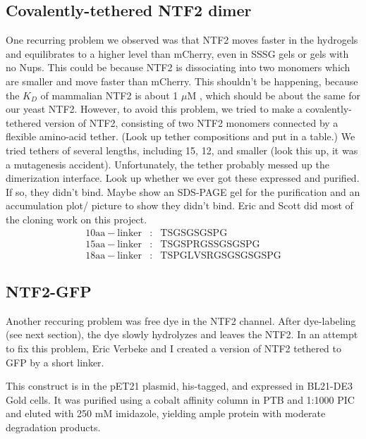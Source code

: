 \subsection{Covalently-tethered NTF2 dimer}
One recurring problem we observed was that NTF2 moves faster in the hydrogels and equilibrates to a higher level than mCherry, even in SSSG gels or gels with no Nups.  This could be because NTF2 is dissociating into two monomers which are smaller and move faster than mCherry.  This shouldn't be happening, because the $K_D$ of mammalian NTF2 is about 1 $\mu$M \cite{chaillan-huntington01}, which should be about the same for our yeast NTF2.  However, to avoid this problem, we tried to make a covalently-tethered version of NTF2, consisting of two NTF2 monomers connected by a flexible amino-acid tether.  (Look up tether compositions and put in a table.)  We tried tethers of several lengths, including 15, 12, and smaller (look this up, it was a mutagenesis accident).  Unfortunately, the tether probably messed up the dimerization interface.  Look up whether we ever got these expressed and purified.  If so, they didn't bind.  Maybe show an SDS-PAGE gel for the purification and an accumulation plot/ picture to show they didn't bind. Eric and Scott did most of the cloning work on this project.
\begin{align*}
\mathrm{10aa-linker}&:&\mathrm{TSGSGSGSPG}\\
\mathrm{15aa-linker}&:&\mathrm{TSGSPRGSSGSGSPG}\\
\mathrm{18aa-linker}&:&\mathrm{TSPGLVSRGSGSGSGSPG}
\end{align*}
\subsection{NTF2-GFP}

Another reccuring problem was free dye in the NTF2 channel.  After dye-labeling (see next section), the dye slowly hydrolyzes and leaves the NTF2.  In an attempt to fix this problem, Eric Verbeke and I created a version of NTF2 tethered to GFP by a short linker.  

This construct is in the pET21 plasmid, his-tagged, and expressed in BL21-DE3 Gold cells.  It was purified using a cobalt affinity column in PTB and 1:1000 PIC and eluted with 250 mM imidazole, yielding ample protein with moderate degradation products.


